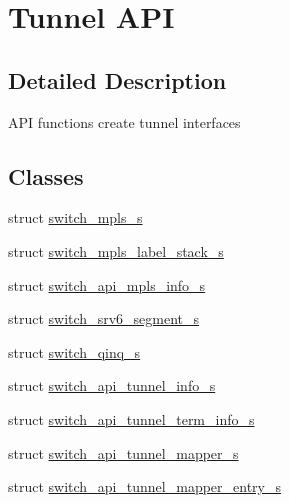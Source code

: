 \hypertarget{group__Tunnel}{\section{Tunnel A\+P\+I}
\label{group__Tunnel}
}


\subsection{Detailed Description}
A\+P\+I functions create tunnel interfaces \subsection*{Classes}
\begin{DoxyCompactItemize}
\item 
struct \hyperlink{structswitch__mpls__s}{switch\+\_\+mpls\+\_\+s}
\item 
struct \hyperlink{structswitch__mpls__label__stack__s}{switch\+\_\+mpls\+\_\+label\+\_\+stack\+\_\+s}
\item 
struct \hyperlink{structswitch__api__mpls__info__s}{switch\+\_\+api\+\_\+mpls\+\_\+info\+\_\+s}
\item 
struct \hyperlink{structswitch__srv6__segment__s}{switch\+\_\+srv6\+\_\+segment\+\_\+s}
\item 
struct \hyperlink{structswitch__qinq__s}{switch\+\_\+qinq\+\_\+s}
\item 
struct \hyperlink{structswitch__api__tunnel__info__s}{switch\+\_\+api\+\_\+tunnel\+\_\+info\+\_\+s}
\item 
struct \hyperlink{structswitch__api__tunnel__term__info__s}{switch\+\_\+api\+\_\+tunnel\+\_\+term\+\_\+info\+\_\+s}
\item 
struct \hyperlink{structswitch__api__tunnel__mapper__s}{switch\+\_\+api\+\_\+tunnel\+\_\+mapper\+\_\+s}
\item 
struct \hyperlink{structswitch__api__tunnel__mapper__entry__s}{switch\+\_\+api\+\_\+tunnel\+\_\+mapper\+\_\+entry\+\_\+s}
\end{DoxyCompactItemize}
